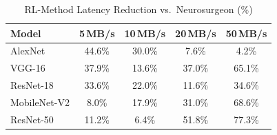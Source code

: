\begin{table}[htbp]
\centering
\caption{RL-Method Latency Reduction vs.\ Neurosurgeon (\%)}
\label{tab:rl_improvement}
\begin{tabular}{lcccc}
\toprule
\textbf{Model} & \textbf{5\,MB/s} & \textbf{10\,MB/s} & \textbf{20\,MB/s} & \textbf{50\,MB/s} \\
\midrule
AlexNet & 44.6\% & 30.0\% & 7.6\% & 4.2\% \\
VGG-16 & 37.9\% & 13.6\% & 37.0\% & 65.1\% \\
ResNet-18 & 33.6\% & 22.0\% & 11.6\% & 34.6\% \\
MobileNet-V2 & 8.0\% & 17.9\% & 31.0\% & 68.6\% \\
ResNet-50 & 11.2\% & 6.4\% & 51.8\% & 77.3\% \\
\bottomrule
\end{tabular}
\end{table}